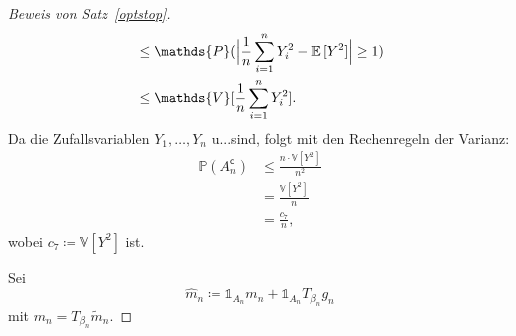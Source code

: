 \begin{proof}[Beweis von Satz~\ref{optstop}]
\begin{equation*}
\begin{split}
& \leq \mathds{P}(\Big|\frac{1}{n}\sum_{i=1}^n Y_i^2 - \E[Y^2]\Big| \geq 1) \\
& \leq \mathds{V}[\frac{1}{n}\sum_{i = 1}^nY_i^2].
\end{split}
\end{equation*}
Da die Zufallsvariablen $Y_1,\dots,Y_n$ u.\@i.\@v.\@ sind, folgt mit den Rechenregeln der Varianz:
\begin{equation}
\label{tscheby}
\begin{split}
\mathds{P}(A_n^{\mathsf{c}}) & \leq \frac{n \cdot  \mathds{V}[Y^2]}{n^2} \\
& = \frac{\mathds{V}[Y^2]}{n} \\
& = \frac{c_7}{n},
\end{split}
\end{equation}
wobei $c_7 \coloneqq \mathds{V}[Y^2]$ ist.

Sei $$\hat{m}_n \coloneqq \mathds{1}_{A_n}m_n + \mathds{1}_{A_n}T_{\beta_n}g_n$$
mit $m_n= T_{\beta_n}\tilde{m}_n$.


\end{proof}
